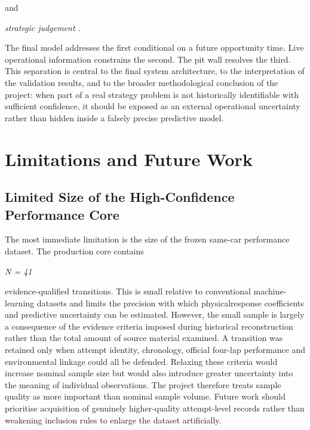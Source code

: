 and

\begin{center}\textit{strategic judgement .}\end{center}

The final model addresses the first conditional on a future opportunity time. Live operational information constrains the second. The pit wall resolves the third. This separation is central to the final system architecture, to the interpretation of the validation results, and to the broader methodological conclusion of the project: when part of a real strategy problem is not historically identifiable with sufficient confidence, it should be exposed as an external operational uncertainty rather than hidden inside a falsely precise predictive model.

\section{Limitations and Future Work}
\label{sec:limitations-future}

\subsection{Limited Size of the High-Confidence Performance Core}
The most immediate limitation is the size of the frozen same-car performance dataset. The production core contains

\begin{center}\textit{N = 41}\end{center}

evidence-qualified transitions. This is small relative to conventional machine-learning datasets and limits the precision with which physicalresponse coefficients and predictive uncertainty can be estimated. However, the small sample is largely a consequence of the evidence criteria imposed during historical reconstruction rather than the total amount of source material examined. A transition was retained only when attempt identity, chronology, official four-lap performance and environmental linkage could all be defended. Relaxing these criteria would increase nominal sample size but would also introduce greater uncertainty into the meaning of individual observations. The project therefore treats sample quality as more important than nominal sample volume. Future work should prioritise acquisition of genuinely higher-quality attempt-level records rather than weakening inclusion rules to enlarge the dataset artificially.

